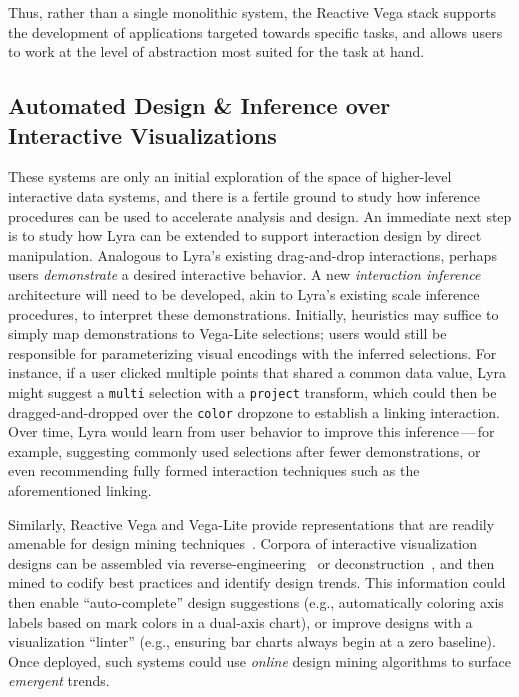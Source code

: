 Thus, rather than a single monolithic system, the Reactive Vega stack supports
the development of applications targeted towards specific tasks, and allows
users to work at the level of abstraction most suited for the task at hand.

\vspace{-10pt}

\subsection{Automated Design \& Inference over Interactive Visualizations}

\vspace{-7pt}

These systems are only an initial exploration of the space of higher-level
interactive data systems, and there is a fertile ground to study how inference
procedures can be used to accelerate analysis and design. An immediate next step
is to study how Lyra can be extended to support interaction design by direct
manipulation. Analogous to Lyra's existing drag-and-drop interactions, perhaps
users \emph{demonstrate} a desired interactive behavior. A new \emph{interaction
inference} architecture will need to be developed, akin to Lyra's existing scale
inference procedures, to interpret these demonstrations. Initially, heuristics
may suffice to simply map demonstrations to Vega-Lite selections; users would
still be responsible for parameterizing visual encodings with the inferred
selections. For instance, if a user clicked multiple points that shared a common
data value, Lyra might suggest a \texttt{multi} selection with a
\texttt{project} transform, which could then be dragged-and-dropped over the
\texttt{color} dropzone to establish a linking interaction. Over time, Lyra
would learn from user behavior to improve this inference\,---\,for example,
suggesting commonly used selections after fewer demonstrations, or even
recommending fully formed interaction techniques such as the aforementioned
linking.

Similarly, Reactive Vega and Vega-Lite provide representations that are readily
amenable for design mining techniques~\cite{kumar:webzeitgeist}. Corpora of
interactive visualization designs can be assembled via
reverse-engineering~\cite{poco:reverse} or
deconstruction~\cite{harper:deconstructing,harper:templates}, and then mined to
codify best practices and identify design trends. This information could then
enable ``auto-complete'' design suggestions (e.g., automatically coloring axis
labels based on mark colors in a dual-axis chart), or improve designs with a
visualization ``linter'' (e.g., ensuring bar charts always begin at a zero
baseline). Once deployed, such systems could use \emph{online} design mining
algorithms to surface \emph{emergent} trends.

